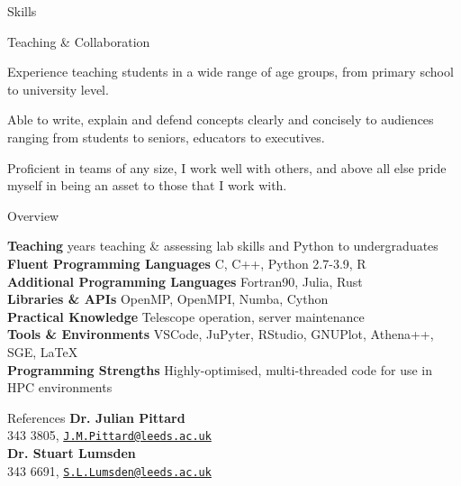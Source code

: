 \documentclass{resume} %
\begin{document}
\begin{rSection}{Skills}
\begin{rPoints}{Teaching \& Collaboration}
	\item Experience teaching students in a wide range of age groups, from primary school to university level.
	\item Able to write, explain and defend concepts clearly and concisely to audiences ranging from students to seniors, educators to executives.
	\item Proficient in teams of any size, I work well with others, and above all else pride myself in being an asset to those that I work with.
\end{rPoints}

\end{rSection}

\begin{rSection}{Overview}

{\bf Teaching}  years teaching \& assessing lab skills and Python to undergraduates \\
{\bf Fluent Programming Languages} \dotfill C, C++, Python 2.7-3.9, R \\
{\bf Additional Programming Languages} \dotfill Fortran90, Julia, Rust \\
{\bf Libraries \& APIs} \dotfill OpenMP, OpenMPI, Numba, Cython \\
{\bf Practical Knowledge} \dotfill Telescope operation, server maintenance \\
{\bf Tools \& Environments} \dotfill VSCode, JuPyter, RStudio, GNUPlot, Athena++, SGE, \LaTeX \\
{\bf Programming Strengths} \dotfill Highly-optimised, multi-threaded code for use in HPC environments

\end{rSection}

\begin{rSection}{References}
	{\bf Dr. Julian Pittard}  \\
	\null{} 343 3805, \texttt{\href{mailto:J.M.Pittard@leeds.ac.uk}{J.M.Pittard@leeds.ac.uk}} \\ 
	{\bf Dr. Stuart Lumsden}  \\
	\null{} 343 6691, \texttt{\href{mailto:S.L.Lumsden@leeds.ac.uk}{S.L.Lumsden@leeds.ac.uk}} \\ 
\end{rSection}

\end{document}
